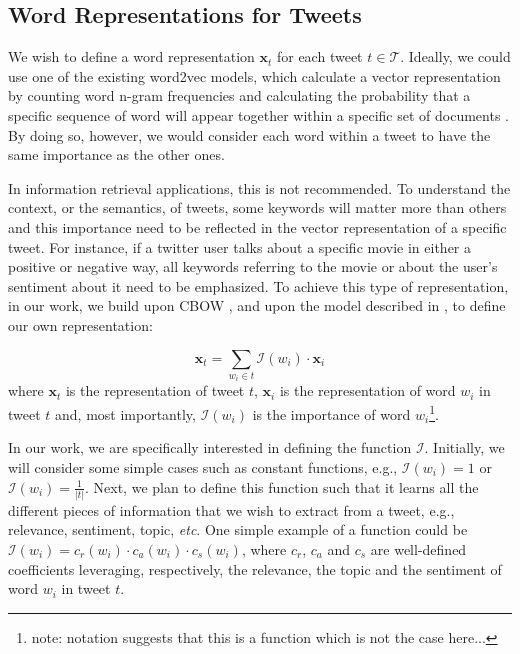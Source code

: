 \documentclass[letterpaper]{article}
\begin{document}
\subsection{Word Representations for Tweets}

We wish to define a word representation $\mathbf{x}_t$ for each tweet $t \in \mathcal{T}$. Ideally, we could use one of the existing word2vec models, which calculate a vector representation by counting word n-gram frequencies and calculating the probability that a specific sequence of word will appear together within a specific set of documents \cite{Mikolov2013a}. By doing so, however, we would consider each word within a tweet to have the same importance as the other ones. 

In information retrieval applications, this is not recommended. To understand the context, or the semantics, of tweets, some keywords will matter more than others and this importance need to be reflected in the vector representation of a specific tweet. For instance, if a twitter user talks about a specific movie in either a positive or negative way, all keywords referring to the movie or about the user's sentiment about it need to be emphasized.  To achieve this type of representation, in our work, we build upon CBOW \cite{Mikolov2013a}, and upon the model described in \cite{Ling2015a}, to define our own representation: 

\begin{equation}
\mathbf{x}_t  = \sum_{w_i \in t} \mathcal{I}(w_i) \cdot \mathbf{x}_i 
\label{eq:sum_of_words}
\end{equation}
where $\mathbf{x}_t$ is the representation of tweet $t$, $\mathbf{x}_i$ is the representation of word $w_i$ in tweet $t$ and, most importantly, $\mathcal{I}(w_i)$ is the importance of word $w_i$\footnote{note: notation suggests that this is a function which is not the case here...}.  

In our work, we are specifically interested in defining the function $\mathcal{I}$. Initially, we will consider some simple cases such as constant functions, e.g., $\mathcal{I}(w_i) = 1$ or $\mathcal{I}(w_i) = \frac{1}{|t|}$. Next, we plan to define this function such that it learns all the different pieces of information that we wish to extract from a tweet, e.g., relevance, sentiment, topic, \emph{etc}.  One simple example of a function could be $\mathcal{I}(w_i) = c_{r} (w_i) \cdot c_{a} (w_i) \cdot c_{s} (w_i)$, where $c_{r}$, $c_{a}$ and $c_{s}$ are well-defined coefficients leveraging, respectively, the relevance, the topic and the sentiment of word $ w_i$ in tweet $t$. 
\end{document}
